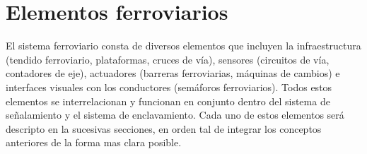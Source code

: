 \section{Elementos ferroviarios}

El sistema ferroviario consta de diversos elementos que incluyen la infraestructura (tendido ferroviario, plataformas, cruces de vía), sensores (circuitos de vía, contadores de eje), actuadores (barreras ferroviarias, máquinas de cambios) e interfaces visuales con los conductores (semáforos ferroviarios). Todos estos elementos se interrelacionan y funcionan en conjunto dentro del sistema de señalamiento y el sistema de enclavamiento. Cada uno de estos elementos será descripto en la sucesivas secciones, en orden tal de integrar los conceptos anteriores de la forma mas clara posible.









